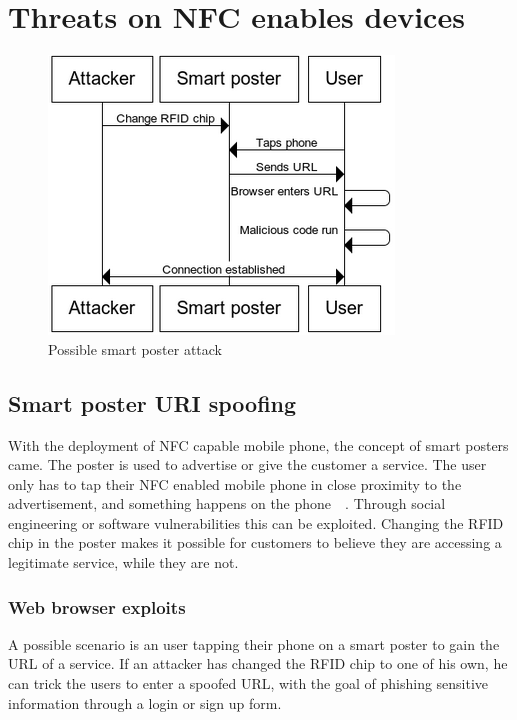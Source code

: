 \documentclass[a4paper,11pt]{article}
\begin{document}
\section{Threats on NFC enables devices}
\begin{figure}
  \centering
  \vspace{-2cm}
  \includegraphics[scale=0.6]{SD_SmartPoster1} %
  \vspace{-0.7cm}
  \caption{Possible smart poster attack
  \label{fig:SD_SmartPoster1}}
\end{figure}
\subsection{Smart poster URI spoofing}

With the deployment of NFC capable mobile phone, the concept of smart posters came.
The poster is used to advertise or give the customer a service. The user only has to tap their NFC enabled mobile phone in close proximity to the advertisement, and something happens on the phone~\cite{ruiz2009university}~\cite{smartposter}. Through social engineering or software vulnerabilities this can be exploited. Changing the RFID chip in the poster makes it possible for customers to believe they are accessing a legitimate service, while they are not.

\subsubsection{Web browser exploits}

A possible scenario is an user tapping their phone on a smart poster to gain the URL of a service. If an attacker has changed the RFID chip to one of his own, he can trick the users to enter a spoofed URL, with the goal of phishing sensitive information through a login or sign up form. 
\end{document}
